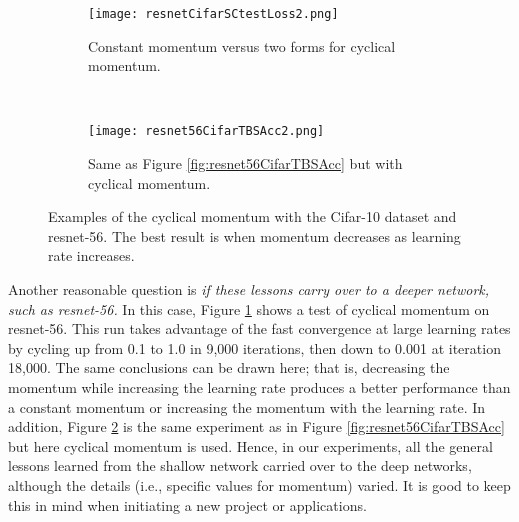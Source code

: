 \documentclass{article} %
\begin{document}
\begin{figure}[tbh]
	\centering
	\centering
	\begin{subfigure}[b]{0.43\textwidth}
		\texttt{[image: resnetCifarSCtestLoss2.png]}
		\caption{Constant momentum versus two forms for cyclical momentum.}
		\label{fig:resnetCifarSCtestLoss2}       %
	\end{subfigure}
	\quad
	\hfill
	~ %
	\begin{subfigure}[b]{0.5\textwidth}
		\texttt{[image: resnet56CifarTBSAcc2.png]}
		\caption{Same as Figure \ref{fig:resnet56CifarTBSAcc} but with cyclical momentum. }
		\label{fig:resnet56CifarTBSAcc2}       %
	\end{subfigure}
	\caption{Examples of the cyclical momentum with the Cifar-10 dataset and resnet-56.  The best result is when momentum decreases as learning rate increases. }
	\label{fig:resnetCifarCM}
	\vspace{-5pt}	
\end{figure}


Another reasonable question is \emph{if these lessons carry over to a deeper network, such as resnet-56.}   In this case, Figure \ref{fig:resnetCifarSCtestLoss2} shows a test of cyclical momentum on resnet-56.  This run takes advantage of the fast convergence at large learning rates by cycling up from 0.1 to 1.0 in 9,000 iterations, then down to 0.001 at iteration 18,000.   The same conclusions can be drawn here; that is, decreasing the momentum while increasing the learning rate produces a better performance than a constant momentum or increasing the momentum with the learning rate.  In addition, Figure \ref{fig:resnet56CifarTBSAcc2} is the same experiment as in Figure \ref{fig:resnet56CifarTBSAcc} but here cyclical momentum is used.  Hence, in our experiments, all the general lessons learned from  the shallow network carried over to the deep networks, although the details (i.e., specific values for momentum) varied.  It is good to keep this in mind when initiating a new project or applications. 


\end{document}
